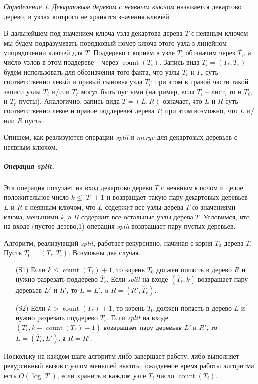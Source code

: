 ﻿\documentclass[11pt]{article}
\theoremstyle{remark}
\newtheorem{definition}{Определение}[section]
\DeclareMathOperator{\cnt}{count} \DeclareMathOperator{\splt}{\emph{split}}
\begin{document}
\begin{definition}
\emph{Декартовым деревом с неявным ключом} называется декартово дерево, в узлах которого не хранятся значения ключей.
\end{definition}

В дальнейшем под значением ключа узла декартова дерева $T$ с неявным ключом мы будем подразумевать порядковый номер ключа этого узла в
линейном упорядочении ключей для $T$. Поддерево с корнем в узле $T_i$ обозначим через $\overline{T_i}$, а число узлов в этом поддереве --
через $\cnt(T_i)$. Запись вида $T_i = (T_\ell, T_r)$ будем использовать для обозначения того факта, что узлы $T_\ell$ и $T_r$ суть
соответственно левый и правый сыновья узла $T_i$; при этом в правой части такой записи узлы $T_\ell$ и/или $T_r$ могут быть пустыми
(например, если $T_i$ -- лист, то и $T_\ell$, и $T_r$ пусты). Аналогично, запись вида $T=(L,R)$ означает, что $L$ и $R$ суть соответственно
левое и правое поддеревья дерева $T$; при этом возможно, что $L$ и/или $R$ пусты.

Опишем, как реализуются операции \emph{split} и \emph{merge} для декартовых деревьев с неявным ключом.

\subparagraph*{Операция \emph{split}.} Эта операция получает на вход декартово дерево $T$ с неявным ключом и целое положительное число
$k\le|T|+1$ и возвращает такую пару декартовых деревьев $L$ и $R$ с неявным ключом, что $L$ содержит все узлы дерева $T$ со значениями
ключа, меньшими $k$, а $R$ содержит все остальные узлы дерева $T$. Условимся, что на входе (пустое дерево,1) операция \emph{split}
возвращает пару пустых деревьев.

Алгоритм, реализующий \emph{split}, работает рекурсивно, начиная с корня $T_0$ дерева $T$. Пусть $T_0 = (T_\ell,T_r)$. Возможны два случая.
\begin{itemize}
  \item[(S1)] Если $k\le\cnt(T_\ell) + 1$, то корень $T_0$ должен попасть в дерево $R$ и нужно разрезать поддерево $\overline{T}_\ell$. Если \emph{split}
  на входе $(\overline{T}_\ell,k)$ возвращает пару деревьев $L'$ и $R'$, то $L = L'$, a $R =(R',\overline{T}_r)$.
  \item[(S2)] Если $k >\cnt(T_\ell) + 1$, то корень $T_0$ должен попасть в дерево $L$ и нужно разрезать поддерево $T_r$.
  Если \emph{split} на входе  $(\overline{T}_r,k -\cnt(T_\ell)-1)$ возвращает пару деревьев $L'$ и $R'$,
  то $L = (\overline{T}_\ell, L')$, а $R = R'$.
\end{itemize}
Поскольку на каждом шаге алгоритм либо завершает работу, либо выполняет рекурсивный вызов с узлом меньшей высоты, ожидаемое время работы
алгоритма есть $O(\log|T|)$, если хранить в каждом узле $T_i$ число $\cnt(T_i)$.
\end{document}
